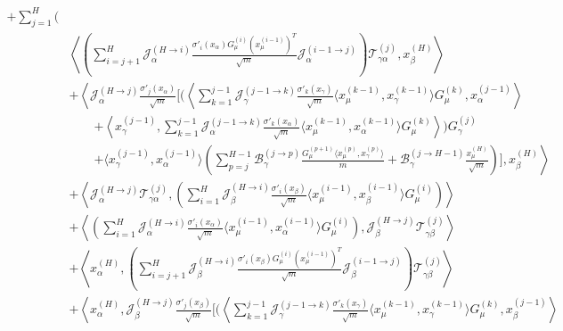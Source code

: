 \documentclass[11pt,a4paper]{article}
\theoremstyle{definition}
\begin{document}
\begin{align}
    + \sum_{j=1}^{H} \Biggl( & \nonumber \\
    & \left\langle \left( \sum_{i=j+1}^{H} \mathcal{J}^{(H \to i)}_{\alpha} \frac{\sigma'_{i}(x_\alpha) G^{(i)}_\mu (x^{(i-1)}_\mu)^T}{\sqrt{m}} \mathcal{J}^{(i-1 \to j)}_{\alpha} \right) \mathcal{T}^{(j)}_{\gamma\alpha}, x^{(H)}_\beta \right\rangle \nonumber \\
    & + \left\langle \mathcal{J}^{(H \to j)}_{\alpha} \frac{\sigma'_{j}(x_\alpha)}{\sqrt{m}} \Biggl[ \Biggl( \left\langle \sum_{k=1}^{j-1} \mathcal{J}^{(j-1 \to k)}_{\gamma} \frac{\sigma'_{k}(x_\gamma)}{\sqrt{m}} \langle x^{(k-1)}_\mu, x^{(k-1)}_\gamma \rangle G^{(k)}_\mu, x^{(j-1)}_\alpha \right\rangle \right. \nonumber \\ 
    & \qquad \left. + \left\langle x^{(j-1)}_\gamma, \sum_{k=1}^{j-1} \mathcal{J}^{(j-1 \to k)}_{\alpha} \frac{\sigma'_{k}(x_\alpha)}{\sqrt{m}} \langle x^{(k-1)}_\mu, x^{(k-1)}_\alpha \rangle G^{(k)}_\mu \right\rangle \Biggr) G^{(j)}_\gamma \right. \nonumber \\
    & \qquad \left. + \langle x^{(j-1)}_\gamma, x^{(j-1)}_\alpha \rangle \left( \sum_{p=j}^{H-1} \mathcal{B}^{(j \to p)}_{\gamma} \frac{G^{(p+1)}_\mu \langle x^{(p)}_\mu, x^{(p)}_\gamma \rangle}{m} + \mathcal{B}^{(j \to H-1)}_{\gamma} \frac{x^{(H)}_\mu}{\sqrt{m}} \right) \Biggr], x^{(H)}_\beta \right\rangle \nonumber \\
    & + \left\langle \mathcal{J}^{(H \to j)}_{\alpha} \mathcal{T}^{(j)}_{\gamma\alpha}, \left(\sum_{i=1}^{H} \mathcal{J}^{(H \to i)}_{\beta} \frac{\sigma'_{i}(x_\beta)}{\sqrt{m}} \langle x^{(i-1)}_\mu, x^{(i-1)}_\beta \rangle G^{(i)}_\mu\right) \right\rangle \nonumber \\
    & + \left\langle \left(\sum_{i=1}^{H} \mathcal{J}^{(H \to i)}_{\alpha} \frac{\sigma'_{i}(x_\alpha)}{\sqrt{m}} \langle x^{(i-1)}_\mu, x^{(i-1)}_\alpha \rangle G^{(i)}_\mu\right), \mathcal{J}^{(H \to j)}_{\beta} \mathcal{T}^{(j)}_{\gamma\beta} \right\rangle \nonumber \\
    & + \left\langle x^{(H)}_\alpha, \left( \sum_{i=j+1}^{H} \mathcal{J}^{(H \to i)}_{\beta} \frac{\sigma'_{i}(x_\beta) G^{(i)}_\mu (x^{(i-1)}_\mu)^T}{\sqrt{m}} \mathcal{J}^{(i-1 \to j)}_{\beta} \right) \mathcal{T}^{(j)}_{\gamma\beta} \right\rangle \nonumber \\
    & + \left\langle x^{(H)}_\alpha, \mathcal{J}^{(H \to j)}_{\beta} \frac{\sigma'_{j}(x_\beta)}{\sqrt{m}} \Biggl[ \Biggl( \left\langle \sum_{k=1}^{j-1} \mathcal{J}^{(j-1 \to k)}_{\gamma} \frac{\sigma'_{k}(x_\gamma)}{\sqrt{m}} \langle x^{(k-1)}_\mu, x^{(k-1)}_\gamma \rangle G^{(k)}_\mu, x^{(j-1)}_\beta \right\rangle \right. \nonumber \\

\end{align}
\end{document}
